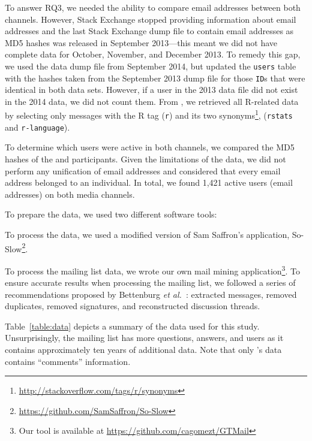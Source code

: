     
To answer RQ3, we needed the ability to compare email addresses between both channels. However, Stack Exchange stopped providing information about email addresses and the last Stack Exchange dump file to contain email addresses as MD5 hashes was released in September 2013---this meant we did not have complete data for October, November, and December 2013. 
To remedy this gap, we used the data dump file from September 2014, but updated the \texttt{users} table with the hashes taken from the September 2013 dump file for those \texttt{ID}s that were identical in both data sets.
However, if a user in the 2013 data file did not exist in the 2014 data, we did not count them.
From \SO, we retrieved all R-related data by selecting only messages with the R tag (\texttt{r}) and its two synonyms\footnote{\url{http://stackoverflow.com/tags/r/synonyms}}, (\texttt{rstats} and \texttt{r-language}).

To determine which users were active in both channels, we compared the MD5 hashes of the \RH and \SO participants. Given the limitations of the \SO data, we did not perform any unification of email addresses and considered that every email address belonged to an individual. In total, we found 1,421 active users (email addresses) on both media channels.


To prepare the data, we used two different software tools:
    \begin{enumerate*}[label=(\arabic*)]
    \item To process the \SO data, we used a modified version of Sam Saffron's application, So-Slow\footnote{\url{https://github.com/SamSaffron/So-Slow}}.
    \item To process the \RH mailing list data, we wrote our own mail mining application\footnote{Our tool is available at
            \url{https://github.com/cagomezt/GTMail}}. To ensure accurate results when processing the \RH mailing list, we followed a series of recommendations proposed by Bettenburg \textit{et al.}~\cite{Bettenburg2009}: extracted messages, removed duplicates, removed signatures, and reconstructed discussion threads.
    \end{enumerate*}
Table~\ref{table:data} depicts a summary of the data used for this study. Unsurprisingly, the \RH mailing list has more questions, answers, and users as it contains approximately ten years of additional data.
Note that only \SO's data contains ``comments'' information.

